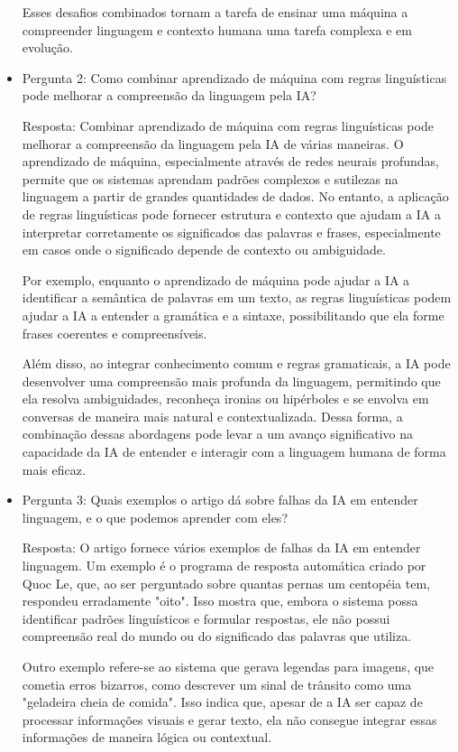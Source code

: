 \documentclass[12 pt]{article}
\begin{document}
\begin{itemize}
    Esses desafios combinados tornam a tarefa de ensinar uma máquina a compreender linguagem e contexto humana uma tarefa complexa e em evolução.

    \item Pergunta 2: Como combinar aprendizado de máquina com regras linguísticas pode melhorar a compreensão da linguagem pela IA?

    Resposta: Combinar aprendizado de máquina com regras linguísticas pode melhorar a compreensão da linguagem pela IA de várias maneiras. O aprendizado de máquina, especialmente através de redes neurais profundas, permite que os sistemas aprendam padrões complexos e sutilezas na linguagem a partir de grandes quantidades de dados. No entanto, a aplicação de regras linguísticas pode fornecer estrutura e contexto que ajudam a IA a interpretar corretamente os significados das palavras e frases, especialmente em casos onde o significado depende de contexto ou ambiguidade.
    
    Por exemplo, enquanto o aprendizado de máquina pode ajudar a IA a identificar a semântica de palavras em um texto, as regras linguísticas podem ajudar a IA a entender a gramática e a sintaxe, possibilitando que ela forme frases coerentes e compreensíveis.
    
    Além disso, ao integrar conhecimento comum e regras gramaticais, a IA pode desenvolver uma compreensão mais profunda da linguagem, permitindo que ela resolva ambiguidades, reconheça ironias ou hipérboles e se envolva em conversas de maneira mais natural e contextualizada. Dessa forma, a combinação dessas abordagens pode levar a um avanço significativo na capacidade 
    da IA de entender e interagir com a linguagem humana de forma mais eficaz.

    \item Pergunta 3: Quais exemplos o artigo dá sobre falhas da IA em entender linguagem, e o que podemos aprender com eles?

    Resposta: O artigo fornece vários exemplos de falhas da IA em entender linguagem. Um exemplo é o programa de resposta automática criado por Quoc Le, que, ao ser perguntado sobre quantas pernas um centopéia tem, respondeu erradamente "oito". Isso mostra que, embora o sistema possa identificar padrões linguísticos e formular respostas, ele não possui compreensão real 
    do mundo ou do significado das palavras que utiliza.

    Outro exemplo refere-se ao sistema que gerava legendas para imagens, que cometia erros bizarros, como descrever um sinal de trânsito como uma "geladeira cheia de comida". Isso indica que, apesar de a IA ser capaz de processar informações visuais e gerar texto, ela não consegue integrar essas informações de maneira lógica ou contextual.


\end{itemize}
\end{document}
